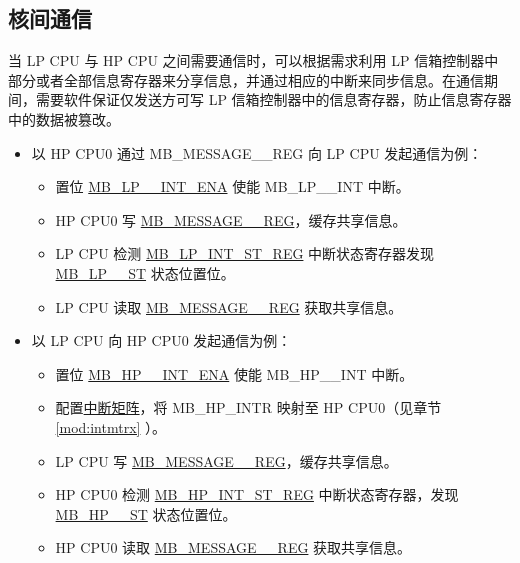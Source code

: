 \documentclass[main\_\_CN.tex]{subfiles}
\begin{document}
\subsection{核间通信}
当 LP CPU 与 HP CPU 之间需要通信时，可以根据需求利用 LP 信箱控制器中部分或者全部信息寄存器来分享信息，并通过相应的中断来同步信息。在通信期间，需要软件保证仅发送方可写 LP 信箱控制器中的信息寄存器，防止信息寄存器中的数据被篡改。
\begin{itemize}
    \item 以 HP CPU0 通过 MB\_MESSAGE\_\_REG 向 LP CPU 发起通信为例：
    \begin{itemize}
        \item 置位 \hyperref[fielddesc:MBLP0INTENA]{MB\_LP\_\_INT\_ENA} 使能 MB\_LP\_\_INT 中断。
        \item HP CPU0 写 \hyperref[regdesc:MBMESSAGE0REG]{MB\_MESSAGE\_\_REG}，缓存共享信息。
        \item LP CPU 检测 \hyperref[regdesc:MBLPINTSTREG]{MB\_LP\_INT\_ST\_REG} 中断状态寄存器发现 \hyperref[fielddesc:MBLP0INTST]{MB\_LP\_\_ST} 状态位置位。
        \item LP CPU 读取 \hyperref[regdesc:MBMESSAGE0REG]{MB\_MESSAGE\_\_REG} 获取共享信息。
    \end{itemize}
    \item 以 LP CPU 向 HP CPU0 发起通信为例：
    \begin{itemize}
        \item 置位 \hyperref[fielddesc:MBHP0INTENA]{MB\_HP\_\_INT\_ENA} 使能 MB\_HP\_\_INT 中断。
        \item 配置\hyperref[mod:intmtrx]{中断矩阵}，将 MB\_HP\_INTR 映射至 HP CPU0（见章节 \ref{mod:intmtrx} \textit{}）。
        \item LP CPU 写 \hyperref[regdesc:MBMESSAGE0REG]{MB\_MESSAGE\_\_REG}，缓存共享信息。
        \item HP CPU0 检测 \hyperref[regdesc:MBHPINTSTREG]{MB\_HP\_INT\_ST\_REG} 中断状态寄存器，发现 \hyperref[fielddesc:MBHP0INTST]{MB\_HP\_\_ST} 状态位置位。
        \item HP CPU0 读取 \hyperref[regdesc:MBMESSAGE0REG]{MB\_MESSAGE\_\_REG} 获取共享信息。
    \end{itemize}
\end{itemize}


\end{document}
